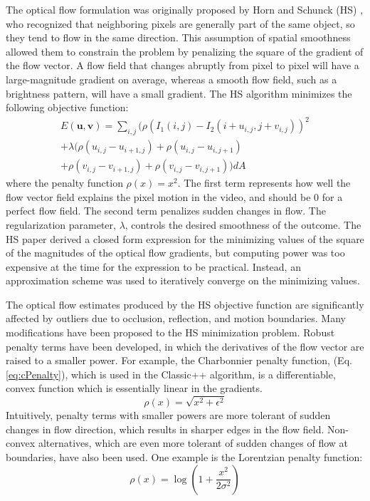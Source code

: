 \documentclass[10pt,twocolumn,letterpaper]{article}
\begin{document}
The optical flow formulation was originally proposed by Horn and Schunck (HS) \cite{horn}, who recognized that neighboring pixels are generally part of the same object, so they tend to flow in the same direction. This assumption of spatial smoothness allowed them to constrain the problem by penalizing the square of the gradient of the flow vector. A flow field that changes abruptly from pixel to pixel will have a large-magnitude gradient on average, whereas a smooth flow field, such as a brightness pattern, will have a small gradient. The HS algorithm minimizes the following objective function:
\begin{multline} \label{eq:hsObj}
E( \mathbf{u}, \mathbf{v}) = \sum\limits_{i,j} (\rho(I_1(i,j) - I_2(i+u_{i,j},j+v_{i,j}))^2 \\ 
+ \lambda (\rho(u_{i,j}-u_{i+1,j}) + \rho(u_{i,j}-u_{i,j+1}) \\ 
+ \rho(v_{i,j}-v_{i+1,j}) +  \rho(v_{i,j}-v_{i,j+1})  ) dA
\end{multline}
where the penalty function $\rho(x) = x^2$. The first term represents how well the flow vector field explains the pixel motion in the video, and should be 0 for a perfect flow field. The second term penalizes sudden changes in flow. The regularization parameter, $\lambda$, controls the desired smoothness of the outcome. The HS paper derived a closed form expression for the minimizing values of the square of the magnitudes of the optical flow gradients, but computing power was too expensive at the time for the expression to be practical. Instead, an approximation scheme was used to iteratively converge on the minimizing values.

The optical flow estimates produced by the HS objective function are significantly affected by outliers due to occlusion, reflection, and motion boundaries. Many modifications have been proposed to the HS minimization problem. Robust penalty terms have been developed, in which the derivatives of the flow vector are raised to a smaller power. For example, the Charbonnier penalty function, (Eq. \ref{eq:cPenalty}), which is used in the Classic++ algorithm, is a differentiable, convex function which is essentially linear in the gradients. 
\begin{equation} \label{eq:cPenalty}
\rho(x) = \sqrt{x^2 + \epsilon^2}
\end{equation}
Intuitively, penalty terms with smaller powers are more tolerant of sudden changes in flow direction, which results in sharper edges in the flow field. Non-convex alternatives, which are even more tolerant of sudden changes of flow at boundaries, have also been used.  One example is the Lorentzian penalty function:
\begin{equation} \label{eq:lPenalty}
\rho(x) = \log(1 + \frac{x^2}{2\sigma^2})
\end{equation}
\end{document}
